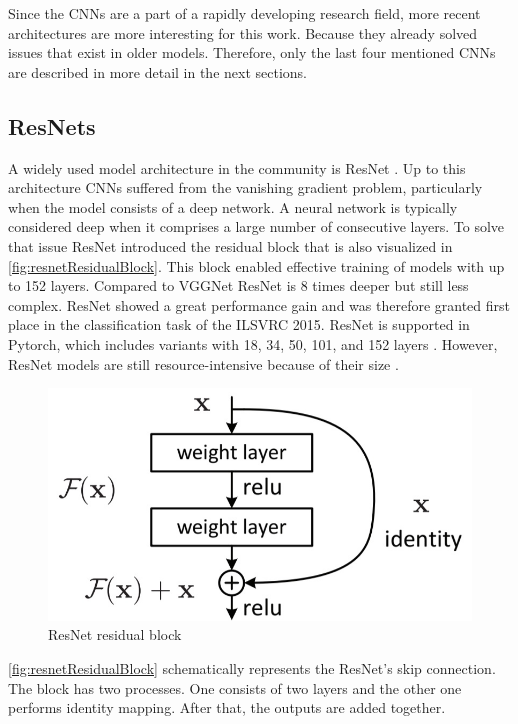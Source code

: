 \vspace{1cm} %

\noindent Since the CNNs are a part of a rapidly developing research field, more recent architectures are more interesting for this work.
Because they already solved issues that exist in older models.
Therefore, only the last four mentioned CNNs are described in more detail in the next sections.

\subsection{ResNets}

A widely used model architecture in the community is ResNet \cite{ResNet}.
Up to this architecture CNNs suffered from the vanishing gradient problem, particularly when the model consists of a deep network.
A neural network is typically considered deep when it comprises a large number of consecutive layers.
To solve that issue ResNet introduced the residual block that is also visualized in \autoref{fig:resnetResidualBlock}.
This block enabled effective training of models with up to 152 layers. Compared to VGGNet ResNet is 8 times deeper but still less complex.
ResNet showed a great performance gain and was therefore granted first place in the classification task of the ILSVRC 2015.
ResNet is supported in Pytorch, which includes variants with 18, 34, 50, 101, and 152 layers \cite{pytorchresnet}. 
However, ResNet models are still resource-intensive because of their size \cite{networkArchitectureSurvey}. 

\begin{figure}[H]
    \centering
    \includegraphics[width=0.5\linewidth]{PICs/backbones/resnet_residualBlock.jpg}
    \caption{ResNet residual block \cite{ResNet}}
    \label{fig:resnetResidualBlock}
\end{figure}

\noindent \autoref{fig:resnetResidualBlock} schematically represents the ResNet's skip connection.
The block has two processes.
One consists of two layers and the other one performs identity mapping.
After that, the outputs are added together.

